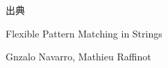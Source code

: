 \documentclass[dvipdfmx,12pt,beamer]{standalone}
\begin{document}
\begin{frame}{出典}
	\begin{description}[style=nextline]
		\item[タイトル] Flexible Pattern Matching in Strings
		\item[著者] Gnzalo Navarro, Mathieu Raffinot
	\end{description}
\end{frame}
\end{document}
